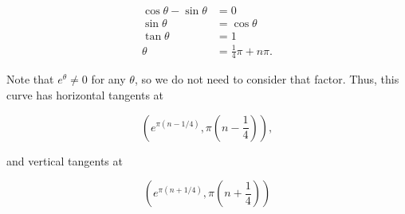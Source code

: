 \documentclass[12pt,oneside,english]{amsart}
\begin{document}
\begin{enumerate}[leftmargin=*]
\begin{enumerate}
\begin{multicols}{2}
\begin{align*}
\cos\theta-\sin\theta&=0 \\
\sin\theta&=\cos\theta \\
\tan\theta&=1 \\
\theta&=\frac{1}{4}\pi+n\pi.
\end{align*}

\end{multicols}

Note that $e^\theta\neq0$ for any $\theta$, so we do not need to consider that factor. Thus, this curve has horizontal tangents at

\[
\left(e^{\pi(n-1/4)},\pi\left(n-\frac{1}{4}\right)\right),
\]

and vertical tangents at

\[
\left(e^{\pi(n+1/4)},\pi\left(n+\frac{1}{4}\right)\right)
\]

\end{enumerate}
\end{enumerate}
\end{document}

